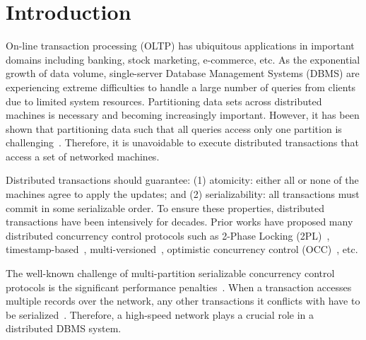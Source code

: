 \section{Introduction}

On-line transaction
processing (OLTP) has ubiquitous 
applications in important domains including
banking, stock marketing, e-commerce, etc. 
As the exponential growth of data volume, single-server Database Management Systems (DBMS) are experiencing extreme difficulties to handle a large number of queries from clients due to limited system resources. Partitioning data sets across distributed machines is
necessary and becoming increasingly important. 
However, it has been shown that partitioning data such that all queries access only one partition is challenging~\cite{curino2010schism,pavlo2012skew}. Therefore, it is unavoidable to execute distributed transactions that access 
a set of networked machines. 

Distributed transactions should guarantee:
(1) atomicity: either all or none of the machines agree to apply the updates; and
(2) serializability: all transactions must commit in some serializable order. 
To ensure these properties, distributed transactions have been intensively for decades.
Prior works have proposed many distributed concurrency control protocols such as 2-Phase Locking (2PL)~\cite{Bernstein:1981:CCD:356842.356846}, timestamp-based~\cite{Bernstein:1981:CCD:356842.356846}, multi-versioned~\cite{bernstein1983multiversion}, optimistic concurrency control (OCC)~\cite{kung1981optimistic}, etc. %

The well-known challenge of multi-partition serializable concurrency control protocols
is the significant performance 
penalties\cite{stonebraker1986case}~\cite{Thomson:2012:CFD:2213836.2213838}.
When a transaction accesses multiple records over the network, any other transactions it conflicts with have to be serialized~\cite{bailis2014coordination}. Therefore, a high-speed network plays a crucial role in a distributed DBMS system.



